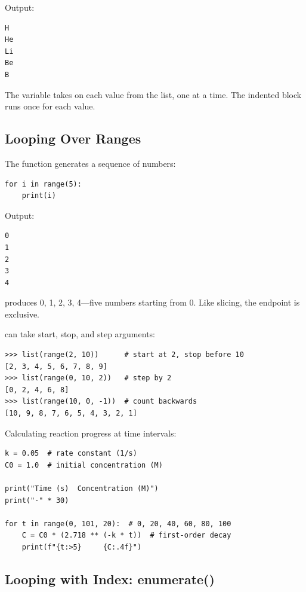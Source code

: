 Output:
\begin{lstlisting}[style=outputstyle]
H
He
Li
Be
B
\end{lstlisting}

The variable  takes on each value from the list, one at a time. The indented block runs once for each value.

\subsection{Looping Over Ranges}

The  function generates a sequence of numbers:

\begin{lstlisting}
for i in range(5):
    print(i)
\end{lstlisting}

Output:
\begin{lstlisting}[style=outputstyle]
0
1
2
3
4
\end{lstlisting}

 produces 0, 1, 2, 3, 4---five numbers starting from 0. Like slicing, the endpoint is exclusive.

 can take start, stop, and step arguments:

\begin{lstlisting}
>>> list(range(2, 10))      # start at 2, stop before 10
[2, 3, 4, 5, 6, 7, 8, 9]
>>> list(range(0, 10, 2))   # step by 2
[0, 2, 4, 6, 8]
>>> list(range(10, 0, -1))  # count backwards
[10, 9, 8, 7, 6, 5, 4, 3, 2, 1]
\end{lstlisting}

\begin{labexample}
Calculating reaction progress at time intervals:

\begin{lstlisting}
k = 0.05  # rate constant (1/s)
C0 = 1.0  # initial concentration (M)

print("Time (s)  Concentration (M)")
print("-" * 30)

for t in range(0, 101, 20):  # 0, 20, 40, 60, 80, 100
    C = C0 * (2.718 ** (-k * t))  # first-order decay
    print(f"{t:>5}     {C:.4f}")
\end{lstlisting}
\end{labexample}

\subsection{Looping with Index: enumerate()}

